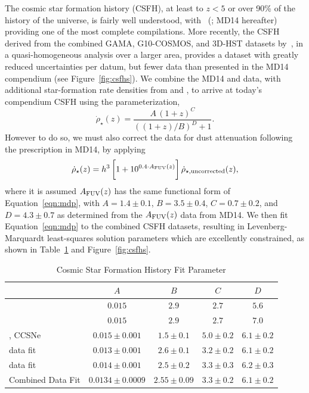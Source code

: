 \documentclass[apj]{aastex62}
\begin{document}
The cosmic star formation history (CSFH), at least to $z < 5$ or over 90\% of the history of the universe, is fairly well understood, with~\citeauthor{Madau:2014fk} (\citeyear{Madau:2014fk}; MD14 hereafter) providing one of the most complete compilations. More recently, the CSFH derived from the combined GAMA, G10-COSMOS, and 3D-HST datasets by~\cite{Driver:2018nr}, in a quasi-homogeneous analysis over a larger area, provides a dataset with greatly reduced uncertainties per datum, but fewer data than presented in the MD14 compendium (see Figure~\ref{fig:csfhs}).  We combine the MD14 and \cite{Driver:2018nr} data, with additional star-formation rate densities from \cite{Bouwens:2015qy} and \cite{Khusanova:2019kx}, to arrive at today's compendium CSFH using the parameterization,
\begin{equation}
\dot{\rho}_{\star}(z) = \frac{A\,(1+z)^C}{((1+z)/B)^D+1}.\label{eqn:mdp}
\end{equation}
However to do so, we must also correct the \cite{Driver:2018nr} data for dust attenuation following the prescription in MD14, by applying 
\begin{equation}
	\dot{\rho}_{\star}(z) =h^3\,\biggl[1+10^{0.4\cdot A_{\rm FUV}(z)}\biggr]\, \dot{\rho}_{\star, {\rm uncorrected}}(z),
\end{equation}
\noindent where it is assumed $A_{\rm FUV}(z)$ has the same functional form of Equation~\ref{eqn:mdp}, with $A=1.4\pm0.1$, $B=3.5\pm0.4$, $C=0.7\pm0.2$, and $D=4.3\pm0.7$ as determined from the $A_{\rm FUV}(z)$ data from MD14. We then fit Equation~\ref{eqn:mdp} to the combined CSFH datasets, resulting in Levenberg-Marquardt least-squares solution parameters which are excellently constrained, as shown in Table~\ref{tab:csfh_fits} and Figure~\ref{fig:csfhs}. 



\begin{table}[h]
    \centering
    \caption{Cosmic Star Formation History Fit Parameter}
    \label{tab:csfh_fits}
    \begin{tabular}{lcccc}
         & $A$ & $B$ & $C$ & $D$ \\
        \hline
        \hline
	\cite{Madau:2014fk} & $0.015$ & $2.9$ & $2.7$ & $5.6$\\
	\cite{Finkelstein:2014fj} & $0.015$ & $2.9$ & $2.7$ & $7.0$\\
	\cite{Strolger:2015aa}, CCSNe& $0.015 \pm 0.001$ & $1.5 \pm 0.1$ & $5.0 \pm 0.2$ & $6.1 \pm 0.2$\\
	\hline
	\cite{Madau:2014fk}\tablenotemark{a} data fit& $0.013 \pm 0.001$ & $2.6 \pm 0.1$ & $3.2 \pm 0.2$ & $6.1 \pm 0.2$\\
	\cite{Driver:2018nr}\tablenotemark{b} data fit& $0.014 \pm 0.001$ & $2.5 \pm 0.2$ & $3.3 \pm 0.3$ & $6.2 \pm 0.3$\\
	\hline
	Combined Data Fit & $0.0134 \pm 0.0009$ & $2.55 \pm 0.09$ & $3.3 \pm 0.2$ & $6.1 \pm 0.2$\\
	\hline
    \end{tabular}
\end{table}
 
\end{document}
